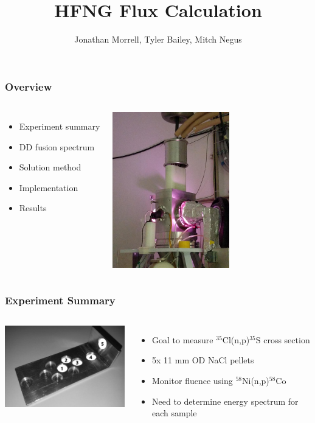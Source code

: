 \documentclass[12pt,xcolor=dvipsnames]{beamer}
\author{Jonathan Morrell, Tyler Bailey, Mitch Negus}
\title{HFNG Flux Calculation}
\begin{document}
\begin{frame}
\titlepage
\end{frame}

\begin{frame}
\frametitle{Overview}
\begin{columns}[c]
\column{2in}
\begin{itemize}
\item Experiment summary
\item DD fusion spectrum
\item Solution method
\item Implementation
\item Results
\end{itemize}
\column{2in}
\includegraphics[width=2in]{hfng.jpg}
\end{columns}
\end{frame}


\begin{frame}
\frametitle{Experiment Summary}
\begin{columns}[c]
\column{2.5in}
\includegraphics[width=2.5in]{sample_holder.jpg}
\column{1.5in}
\begin{itemize}
\item Goal to measure $^{35}$Cl(n,p)$^{35}$S cross section
\item 5x 11 mm OD NaCl pellets
\item Monitor fluence using $^{58}$Ni(n,p)$^{58}$Co
\item Need to determine energy spectrum for each sample
\end{itemize}
\end{columns}
\end{frame}
\end{document}
